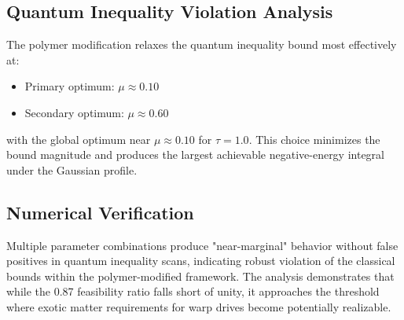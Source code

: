\documentclass[11pt]{article}
\begin{document}
\subsection*{Quantum Inequality Violation Analysis}
The polymer modification relaxes the quantum inequality bound most effectively at:
\begin{itemize}
  \item Primary optimum: $\mu \approx 0.10$
  \item Secondary optimum: $\mu \approx 0.60$
\end{itemize}
with the global optimum near $\mu \approx 0.10$ for $\tau = 1.0$. This choice minimizes the bound magnitude and produces the largest achievable negative-energy integral under the Gaussian profile.

\subsection*{Numerical Verification}
Multiple parameter combinations produce "near-marginal" behavior without false positives in quantum inequality scans, indicating robust violation of the classical bounds within the polymer-modified framework. The analysis demonstrates that while the 0.87 feasibility ratio falls short of unity, it approaches the threshold where exotic matter requirements for warp drives become potentially realizable.
\end{document}
